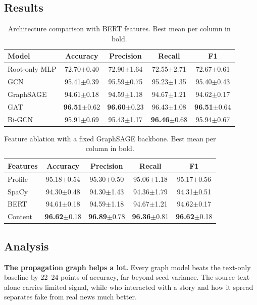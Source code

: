 \documentclass[12pt,a4paper]{article}
\begin{document}
\subsection{Results}

\begin{table}[h]
\centering
\caption{Architecture comparison with BERT features. Best mean per column in bold.}
\begin{tabular}{lcccc}
\toprule
Model & Accuracy & Precision & Recall & F1 \\
\midrule
Root-only MLP & 72.70$\pm$0.40 & 72.90$\pm$1.64 & 72.55$\pm$2.71 & 72.67$\pm$0.61 \\
GCN & 95.41$\pm$0.39 & 95.59$\pm$0.75 & 95.23$\pm$1.35 & 95.40$\pm$0.43 \\
GraphSAGE & 94.61$\pm$0.18 & 94.59$\pm$1.18 & 94.67$\pm$1.21 & 94.62$\pm$0.17 \\
GAT & \textbf{96.51}$\pm$0.62 & \textbf{96.60}$\pm$0.23 & 96.43$\pm$1.08 & \textbf{96.51}$\pm$0.64 \\
Bi-GCN & 95.91$\pm$0.69 & 95.43$\pm$1.17 & \textbf{96.46}$\pm$0.68 & 95.94$\pm$0.67 \\
\bottomrule
\end{tabular}
\end{table}

\begin{table}[h]
\centering
\caption{Feature ablation with a fixed GraphSAGE backbone. Best mean per column in bold.}
\begin{tabular}{lcccc}
\toprule
Features & Accuracy & Precision & Recall & F1 \\
\midrule
Profile & 95.18$\pm$0.54 & 95.30$\pm$0.50 & 95.06$\pm$1.18 & 95.17$\pm$0.56 \\
SpaCy & 94.30$\pm$0.48 & 94.30$\pm$1.43 & 94.36$\pm$1.79 & 94.31$\pm$0.51 \\
BERT & 94.61$\pm$0.18 & 94.59$\pm$1.18 & 94.67$\pm$1.21 & 94.62$\pm$0.17 \\
Content & \textbf{96.62}$\pm$0.18 & \textbf{96.89}$\pm$0.78 & \textbf{96.36}$\pm$0.81 & \textbf{96.62}$\pm$0.18 \\
\bottomrule
\end{tabular}
\end{table}

\subsection{Analysis}

\textbf{The propagation graph helps a lot.} Every graph model beats the text-only baseline by 22--24 points of accuracy, far beyond seed variance. The source text alone carries limited signal, while who interacted with a story and how it spread separates fake from real news much better.
\end{document}
